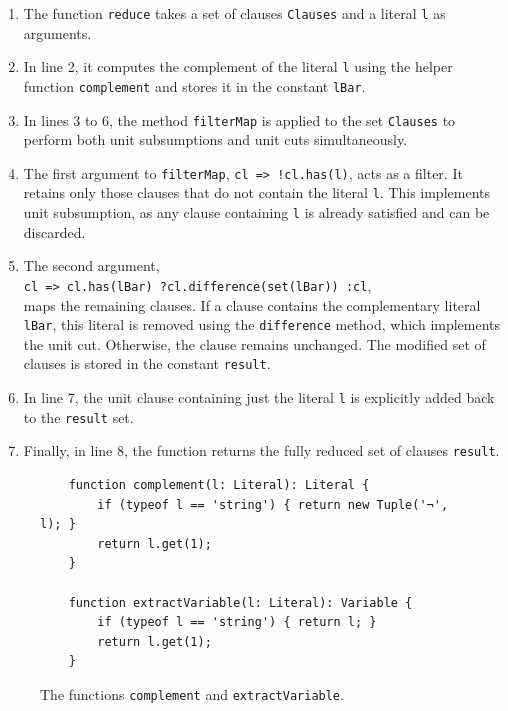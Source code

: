\begin{enumerate}
\item The function \texttt{reduce} takes a set of clauses \texttt{Clauses} and a literal \texttt{l} as arguments.
\item In line 2, it computes the complement of the literal \texttt{l} using the helper function
  \texttt{complement} and stores it in the constant \texttt{lBar}. 
\item In lines 3 to 6, the method \texttt{filterMap} is applied to the set \texttt{Clauses} to perform both
  unit subsumptions and unit cuts simultaneously. 
\item The first argument to \texttt{filterMap}, \texttt{cl => !cl.has(l)}, acts as a filter. It retains only
  those clauses that do not contain the literal \texttt{l}. This implements unit subsumption, as any clause
  containing \texttt{l} is already satisfied and can be discarded. 
\item The second argument, 
  \\[0.2cm]
  \hspace*{1.3cm}
  \texttt{cl => cl.has(lBar) ?\;cl.difference(set(lBar)) :\;cl}, 
  \\[0.2cm]
  maps the remaining clauses. If a clause contains the complementary literal \texttt{lBar}, this literal is
  removed using the \texttt{difference} method, which implements the unit cut. Otherwise, the clause remains
  unchanged. The modified set of clauses is stored in the constant \texttt{result}. 
\item In line 7, the unit clause containing just the literal \texttt{l} is explicitly added back to the
  \texttt{result} set. 
\item Finally, in line 8, the function returns the fully reduced set of clauses \texttt{result}.
\end{enumerate}




\begin{figure}[!ht]
  \centering
\begin{verbatim}
    function complement(l: Literal): Literal {
        if (typeof l == 'string') { return new Tuple('¬', l); } 
        return l.get(1);
    }

    function extractVariable(l: Literal): Variable {
        if (typeof l == 'string') { return l; }
        return l.get(1);
    }
  \end{verbatim}
\vspace*{-0.3cm}
  \caption{The functions \texttt{complement} and \texttt{extractVariable}.}
  \label{fig:solve-aux}
\end{figure}

